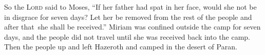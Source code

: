 \begin{inparaenum}
   So the \textsc{Lord} said to Moses, ``If her father had spat in her face, would she not be in disgrace for seven days? Let her be removed from the rest of the people and after that\understood\ she shall be received.''%
   Miriam was confined outside the camp for seven days, and the people did not travel until she was received back into the camp.%
   Then the people up and left Hazeroth and camped in the desert of Paran.%
\end{inparaenum}
